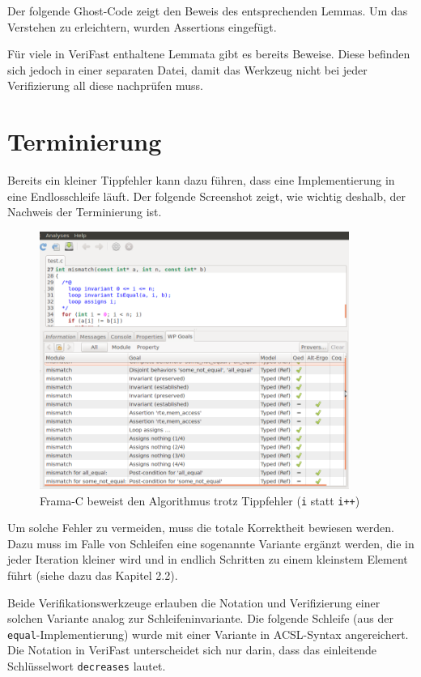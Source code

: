Der folgende Ghost-Code zeigt den Beweis des entsprechenden Lemmas. Um das Verstehen zu erleichtern,
wurden Assertions eingefügt.


Für viele in VeriFast enthaltene Lemmata gibt es bereits Beweise. Diese befinden sich jedoch in einer separaten
Datei, damit das Werkzeug nicht bei jeder Verifizierung all diese nachprüfen muss.


\section{Terminierung}

Bereits ein kleiner Tippfehler kann dazu führen, dass eine Implementierung in eine Endlosschleife läuft. Der folgende
Screenshot zeigt, wie wichtig deshalb, der Nachweis der Terminierung ist.

\begin{figure}[H]
	\centering
\includegraphics[width=0.9\textwidth]{images/frama-c-partial-correctness.png}
\caption{Frama-C beweist den Algorithmus trotz Tippfehler (\texttt{i} statt \texttt{i++})}
\end{figure}

Um solche Fehler zu vermeiden, muss die totale Korrektheit bewiesen werden. Dazu muss im Falle von Schleifen 
eine sogenannte Variante ergänzt werden, die in jeder Iteration kleiner wird und in endlich Schritten zu einem 
kleinstem Element führt (siehe dazu das Kapitel 2.2).

Beide Verifikationswerkzeuge erlauben die Notation und Verifizierung einer solchen Variante analog zur
Schleifeninvariante. Die folgende Schleife (aus der \texttt{equal}-Implementierung) wurde mit einer Variante 
in ACSL-Syntax angereichert. Die Notation in VeriFast unterscheidet sich nur darin, dass das einleitende
Schlüsselwort \texttt{decreases} lautet.

